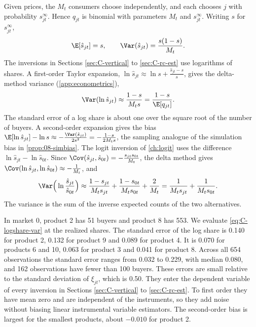 Given prices, the $M_t$ consumers choose independently, and each chooses $j$ with probability $s^\infty_{jt}$. Hence
$q_{jt}$ is binomial with parameters $M_t$ and $s^\infty_{jt}$. Writing $s$ for $s^\infty_{jt}$,
\begin{equation}\label{eq:C-share-var}
  \E[\hat s_{jt}] = s , \qquad \Var(\hat s_{jt}) = \frac{s(1 - s)}{M_t} .
\end{equation}
The inversions in Sections \ref{sec:C-vertical} to \ref{sec:C-rc-est} use logarithms of shares. A first-order Taylor
expansion, $\ln\hat s_{jt} \approx \ln s + \frac{\hat s_{jt} - s}{s}$, gives the delta-method variance
(\cref{app:econometrics}),
\begin{equation}\label{eq:C-logshare-var}
  \Var(\ln\hat s_{jt}) \approx \frac{1 - s}{M_ts} = \frac{1 - s}{\E[q_{jt}]} .
\end{equation}
The standard error of a log share is about one over the square root of the number of buyers. A second-order expansion
gives the bias $\E[\ln\hat s_{jt}] - \ln s \approx -\frac{\Var(\hat s_{jt})}{2s^2} = -\frac{1 - s}{2M_ts}$, the
sampling analogue of the simulation bias in \cref{prop:08-simbias}. The logit inversion of \cref{ch:logit} uses the
difference $\ln\hat s_{jt} - \ln\hat s_{0t}$. Since $\Cov(\hat s_{jt}, \hat s_{0t}) = -\frac{s_{jt}s_{0t}}{M_t}$, the
delta method gives $\Cov(\ln\hat s_{jt}, \ln\hat s_{0t}) \approx -\frac{1}{M_t}$, and
\begin{equation}\label{eq:C-logratio-var}
  \Var\Big(\ln\frac{\hat s_{jt}}{\hat s_{0t}}\Big)
  \approx \frac{1 - s_{jt}}{M_ts_{jt}} + \frac{1 - s_{0t}}{M_ts_{0t}} + \frac{2}{M_t}
  = \frac{1}{M_ts_{jt}} + \frac{1}{M_ts_{0t}} .
\end{equation}
The variance is the sum of the inverse expected counts of the two alternatives.

In market 0, product 2 has 51 buyers and product 8 has 553. We evaluate \eqref{eq:C-logshare-var} at the realized
shares. The standard error of the log share is 0.140 for product 2, 0.132 for product 9 and 0.089 for product 4. It
is 0.070 for products 6 and 10, 0.063 for product 3 and 0.041 for product 8. Across all 654 observations the standard error ranges from 0.032
to 0.229, with median 0.080, and 162 observations have fewer than 100 buyers. These errors are small relative to the
standard deviation of $\xi_{jt}$, which is 0.50. They enter the dependent variable of every inversion in Sections
\ref{sec:C-vertical} to \ref{sec:C-rc-est}. To first order they have mean zero and are independent of the instruments,
so they add noise without biasing linear instrumental variable estimators. The second-order bias is largest for the
smallest products, about $-0.010$ for product 2.

